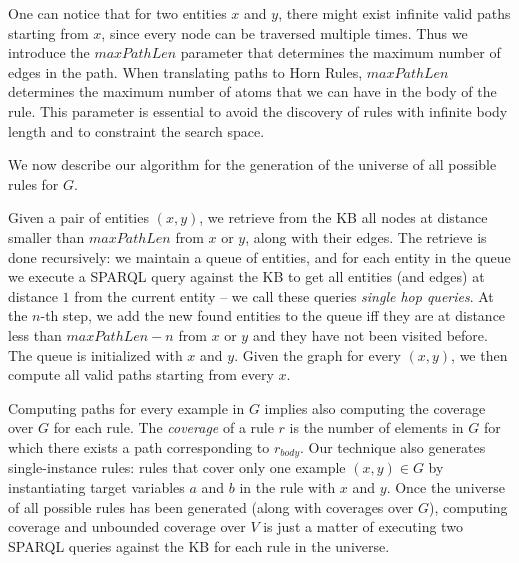 One can notice that for two entities $x$ and $y$, there might exist infinite valid paths starting from $x$, since every node can be traversed multiple times. Thus we introduce the $maxPathLen$ parameter that determines the maximum number of edges in the path. When translating paths to Horn Rules, $maxPathLen$ determines the maximum number of atoms that we can have in the body of the rule. This parameter is essential to avoid the discovery of rules with infinite body length and to constraint the search space.

We now describe our algorithm for the generation of the universe of all possible rules for $G$. 

\vspace{0.5ex}
Given a pair of entities $(x,y)$, we retrieve from the KB all nodes at distance smaller than $maxPathLen$ from $x$ or $y$, along with their edges. The retrieve is done recursively: we maintain a queue of entities, and for each entity in the queue we execute a SPARQL query against the KB to get all entities (and edges) at distance $1$ from the current entity -- we call these queries \emph{single hop queries}. At the $n$-th step, we add the new found entities to the queue iff they are at distance less than $maxPathLen-n$ from $x$ or $y$ and they have not been visited before. The queue is initialized with $x$ and $y$. 
%
Given the graph for every $(x,y)$, we then compute all valid paths starting from every $x$. 

\vspace{0.5ex}
Computing paths for every example in $G$ implies also computing the coverage over $G$ for each rule. The {\em coverage} of a rule $r$ is the number of elements in $G$ for which there exists a path corresponding to $r_{body}$. 
%
Our technique also generates single-instance rules: rules that cover only one example $(x,y) \in G$ by instantiating target variables $a$ and $b$ in the rule with $x$ and $y$. 
%
Once the universe of all possible rules has been generated (along with coverages over $G$), computing coverage and unbounded coverage over $V$ is just a matter of executing two SPARQL queries against the KB for each rule in the universe.

